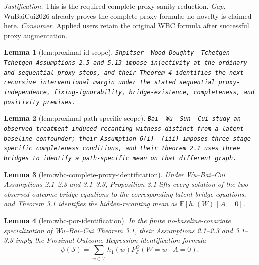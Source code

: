 \documentclass{article}
\newtheorem{lemma}{Lemma}
\begin{document}
\par\smallskip\noindent \textit{Justification.} This is the required complete-proxy sanity reduction. \textit{Gap.} WuBaiCui2026 already proves the complete-proxy formula; no novelty is claimed here. \textit{Consumer.} Applied users retain the original WBC formula after successful proxy augmentation.

\begin{lemma}[lem:proximal-id-scope]\label{lem:proximal-id-scope}
\texttt{Shpitser-\allowbreak{}-\allowbreak{}Wood-\allowbreak{}Doughty-\allowbreak{}-\allowbreak{}Tchetgen Tchetgen Assumptions 2.5 and 5.13 impose injectivity at the ordinary and sequential proxy steps,\allowbreak{} and their Theorem 4 identifies the next recursive interventional margin under the stated sequential proxy-\allowbreak{}independence,\allowbreak{} fixing-\allowbreak{}ignorability,\allowbreak{} bridge-\allowbreak{}existence,\allowbreak{} completeness,\allowbreak{} and positivity premises.}
\end{lemma}

\begin{lemma}[lem:proximal-path-specific-scope]\label{lem:proximal-path-specific-scope}
\texttt{Bai-\allowbreak{}-\allowbreak{}Wu-\allowbreak{}-\allowbreak{}Sun-\allowbreak{}-\allowbreak{}Cui study an observed treatment-\allowbreak{}induced recanting witness distinct from a latent baseline confounder;\allowbreak{} their Assumption 6(i)-\allowbreak{}-\allowbreak{}(iii) imposes three stage-\allowbreak{}specific completeness conditions,\allowbreak{} and their Theorem 2.1 uses three bridges to identify a path-\allowbreak{}specific mean on that different graph.}
\end{lemma}

\begin{lemma}[lem:wbc-complete-proxy-identification]\label{lem:wbc-complete-proxy-identification}
Under Wu--Bai--Cui Assumptions 2.1--2.3 and 3.1--3.3, Proposition 3.1 lifts every solution of the two observed outcome-bridge equations to the corresponding latent bridge equations, and Theorem 3.1 identifies the hidden-recanting mean as \(\mathbb E[h_1(W)\mid A=0]\).
\end{lemma}

\begin{lemma}[lem:wbc-por-identification]\label{lem:wbc-por-identification}
In the finite no-baseline-covariate specialization of Wu--Bai--Cui Theorem 3.1, their Assumptions 2.1--2.3 and 3.1--3.3 imply the Proximal Outcome Regression identification formula
\[
 \psi(\mathcal S)=\sum_{w\in\mathcal X}h_1(w)P_{\mathcal S}^O(W=w\mid A=0).
\]
\end{lemma}
\end{document}
